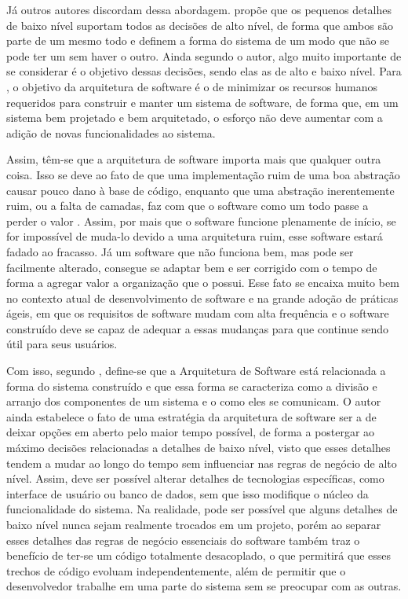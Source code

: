 \documentclass[12pt, %
openright, 
oneside, %
a4paper,    %
brazil]{facom-ufu-abntex2}
\begin{document}
Já outros autores discordam dessa abordagem.  propõe que os pequenos detalhes de baixo nível suportam todos as decisões de alto nível, de forma que ambos são parte de um mesmo todo e definem a forma do sistema de um modo que não se pode ter um sem haver o outro. Ainda segundo o autor, algo muito importante de se considerar é o objetivo dessas decisões, sendo elas as de alto e baixo nível. Para , o objetivo da arquitetura de software é o de minimizar os recursos humanos requeridos para construir e manter um sistema de software, de forma que, em um sistema bem projetado e bem arquitetado, o esforço não deve aumentar com a adição de novas funcionalidades ao sistema.

Assim, têm-se que a arquitetura de software importa mais que qualquer outra coisa. Isso se deve ao fato de que uma implementação ruim de uma boa abstração causar pouco dano à base de código, enquanto que uma abstração inerentemente ruim, ou a falta de camadas, faz com que o software como um todo passe a perder o valor \cite{KIEHL}. Assim, por mais que o software funcione plenamente de início, se for impossível de muda-lo devido a uma arquitetura ruim, esse software estará fadado ao fracasso. Já um software que não funciona bem, mas pode ser facilmente alterado, consegue se adaptar bem e ser corrigido com o tempo de forma a agregar valor a organização que o possui. Esse fato se encaixa muito bem no contexto atual de desenvolvimento de software e na grande adoção de práticas ágeis, em que os requisitos de software mudam com alta frequência e o software construído deve se capaz de adequar a essas mudanças para que continue sendo útil para seus usuários.

Com isso, segundo , define-se que a Arquitetura de Software está relacionada a forma do sistema construído e que essa forma se caracteriza como a divisão e arranjo dos componentes de um sistema e o como eles se comunicam. O autor ainda estabelece o fato de uma estratégia da arquitetura de software ser a de deixar opções em aberto pelo maior tempo possível, de forma a postergar ao máximo decisões relacionadas a detalhes de baixo nível, visto que esses detalhes tendem a mudar ao longo do tempo sem influenciar nas regras de negócio de alto nível. Assim, deve ser possível alterar detalhes de tecnologias específicas, como interface de usuário ou banco de dados, sem que isso modifique o núcleo da funcionalidade do sistema. Na realidade, pode ser possível que alguns detalhes de baixo nível nunca sejam realmente trocados em um projeto, porém ao separar esses detalhes das regras de negócio essenciais do software também traz o benefício de ter-se um código totalmente desacoplado, o que permitirá que esses trechos de código evoluam independentemente, além de permitir que o desenvolvedor trabalhe em uma parte do sistema sem se preocupar com as outras.
\end{document}
